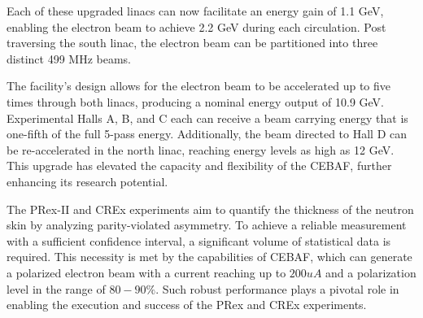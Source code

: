 Each of these upgraded linacs can now facilitate an energy gain of 1.1 GeV, enabling the electron beam to achieve 2.2 GeV during each circulation. Post traversing the south linac, the electron beam can be partitioned into three distinct 499 MHz beams.

The facility's design allows for the electron beam to be accelerated up to five times through both linacs, producing a nominal energy output of 10.9 GeV. Experimental Halls A, B, and C each can receive a beam carrying energy that is one-fifth of the full 5-pass energy. Additionally, the beam directed to Hall D can be re-accelerated in the north linac, reaching energy levels as high as 12 GeV. This upgrade has elevated the capacity and flexibility of the CEBAF, further enhancing its research potential.


The PRex-II and CREx experiments aim to quantify the thickness of the neutron skin by analyzing parity-violated asymmetry. To achieve a reliable measurement with a sufficient confidence interval, a significant volume of statistical data is required. This necessity is met by the capabilities of CEBAF, which can generate a polarized electron beam with a current reaching up to $200 uA$ and a polarization level in the range of $80-90\%$. Such robust performance plays a pivotal role in enabling the execution and success of the PRex and CREx experiments.


